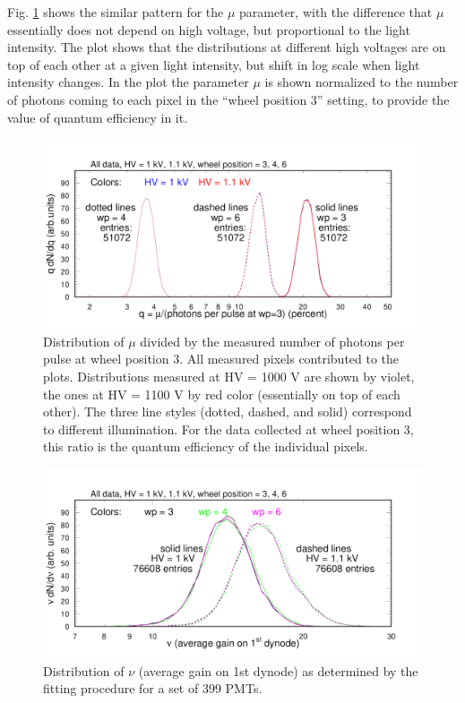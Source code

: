 Fig. \ref{fig:pglobal_qe_all} shows the similar pattern for the $\mu$ parameter, with the difference that $\mu$ essentially does not depend on high voltage, but proportional to the light intensity. The plot shows that the distributions at different high voltages are on top of each other at a given light intensity, but shift in log scale when light intensity changes. In the plot the parameter $\mu$ is shown normalized to the number of photons coming to each pixel in the ``wheel position 3'' setting, to provide the value of quantum efficiency in it. 
\begin{figure}[hbt]
	\centering
	\includegraphics[width=0.95\linewidth]{figures/pglobal_qe_all.pdf}
	\caption{Distribution of $\mu$ divided by the measured number of photons per pulse at wheel position 3. All measured pixels contributed to the plots. Distributions measured at HV = 1000 V are shown by violet, the ones at HV = 1100 V by red color (essentially on top of each other). The three line styles (dotted, dashed, and solid) correspond to different illumination. For the data collected at wheel position 3, this ratio is the quantum efficiency of the individual pixels.}
	\label{fig:pglobal_qe_all}
\end{figure}
\begin{figure}[h!bt]
	\centering
	\includegraphics[width=0.95\linewidth, trim={0mm 0mm 0mm 19mm}, clip]{figures/pglobal_nu.pdf}
	\caption{Distribution of $\nu$ (average gain on 1st dynode) as determined by the fitting procedure for a set of 399 PMTs.}
	\label{fig:pglobal_nu}
\end{figure}



